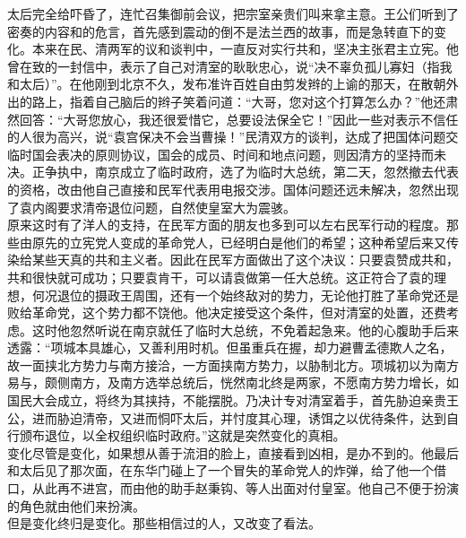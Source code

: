 太后完全给吓昏了，连忙召集御前会议，把宗室亲贵们叫来拿主意。王公们听到了密奏的内容和的危言，首先感到震动的倒不是法兰西的故事，而是急转直下的变化。本来在民、清两军的议和谈判中，一直反对实行共和，坚决主张君主立宪。他曾在致的一封信中，表示了自己对清室的耿耿忠心，说“决不辜负孤儿寡妇（指我和太后）”。在他刚到北京不久，发布准许百姓自由剪发辫的上谕的那天，在散朝外出的路上，指着自己脑后的辫子笑着问道：“大哥，您对这个打算怎么办？”他还肃然回答：“大哥您放心，我还很爱惜它，总要设法保全它！”因此一些对表示不信任的人很为高兴，说“袁宫保决不会当曹操！”民清双方的谈判，达成了把国体问题交临时国会表决的原则协议，国会的成员、时间和地点问题，则因清方的坚持而未决。正争执中，南京成立了临时政府，选了为临时大总统，第二天，忽然撤去代表的资格，改由他自己直接和民军代表用电报交涉。国体问题还远未解决，忽然出现了袁内阁要求清帝退位问题，自然使皇室大为震骇。\\

原来这时有了洋人的支持，在民军方面的朋友也多到可以左右民军行动的程度。那些由原先的立宪党人变成的革命党人，已经明白是他们的希望；这种希望后来又传染给某些天真的共和主义者。因此在民军方面做出了这个决议：只要袁赞成共和，共和很快就可成功；只要袁肯干，可以请袁做第一任大总统。这正符合了袁的理想，何况退位的摄政王周围，还有一个始终敌对的势力，无论他打胜了革命党还是败给革命党，这个势力都不饶他。他决定接受这个条件，但对清室的处置，还费考虑。这时他忽然听说在南京就任了临时大总统，不免着起急来。他的心腹助手后来透露：“项城本具雄心，又善利用时机。但虽重兵在握，却力避曹孟德欺人之名，故一面挟北方势力与南方接洽，一方面挟南方势力，以胁制北方。项城初以为南方易与，颇侧南方，及南方选举总统后，恍然南北终是两家，不愿南方势力增长，如国民大会成立，将终为其挟持，不能摆脱。乃决计专对清室着手，首先胁迫亲贵王公，进而胁迫清帝，又进而恫吓太后，并忖度其心理，诱饵之以优待条件，达到自行颁布退位，以全权组织临时政府。”这就是突然变化的真相。\\

变化尽管是变化，如果想从善于流泪的脸上，直接看到凶相，是办不到的。他最后和太后见了那次面，在东华门碰上了一个冒失的革命党人的炸弹，给了他一个借口，从此再不进宫，而由他的助手赵秉钩、等人出面对付皇室。他自己不便于扮演的角色就由他们来扮演。\\

但是变化终归是变化。那些相信过的人，又改变了看法。\\

